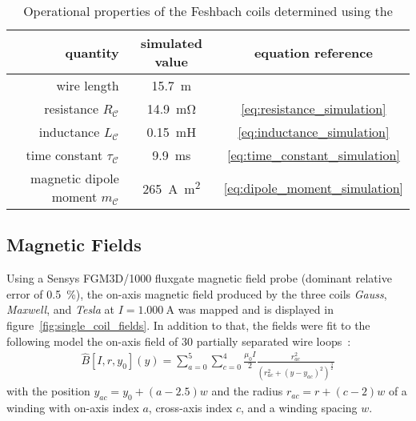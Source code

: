 \begin{table}
    \centering
    \begin{tabular}{rcc}
        \toprule
        \textbf{quantity} & \textbf{simulated value}  & \textbf{equation reference} \\
        \toprule
        wire length & \SI{15.7}{\meter} & \\
        resistance $R_\mathcal{C}$ & \SI{14.9}{\milli\ohm} & \eqref {eq:resistance_simulation} \\
        inductance $L_\mathcal{C}$ & \SI{0.15}{\milli\henry} & \eqref{eq:inductance_simulation} \\ 
        time constant $\tau_\mathcal{C}$ & \SI{9.9}{\milli\second} & \eqref{eq:time_constant_simulation}\\
        magnetic dipole moment $m_\mathcal{C}$ & \SI{265}{\ampere\square\meter} & \eqref{eq:dipole_moment_simulation} \\
        \bottomrule
    \end{tabular}
    \caption{Operational properties of the Feshbach coils determined using the }
    \label{tab:operational_properties}
\end{table}

\subsection*{Magnetic Fields}
Using a Sensys FGM3D/1000 fluxgate magnetic field probe (dominant relative error of \SI{0.5}{\percent}), the on-axis magnetic field produced by the three coils \textit{Gauss}, \textit{Maxwell}, and \textit{Tesla} at $I = \SI{1.000}{\ampere}$ was mapped and is displayed in figure~\ref{fig:single_coil_fields}. In addition to that, the fields were fit to the following model the on-axis field of \SI{30}{} partially separated wire loops~\cite{demtroder_statische_2013}:
\begin{align}\label{eq:on_axis_field_model}
    \hat B[I, r, y_0](y) = \sum\limits_{a = 0}^5 \sum\limits_{c = 0}^4 \frac{\mu_0 I}{2} \frac{r_{ac}^2}{\left(r_{ac}^2 + (y - y_{ac})^2\right)^\frac{3}{2}}
\end{align}
with the position $y_{ac} = y_0 + (a - 2.5) w$ and the radius $r_{ac} = r + (c-2)w$ of a winding with on-axis index $a$, cross-axis index $c$, and a winding spacing $w$.

